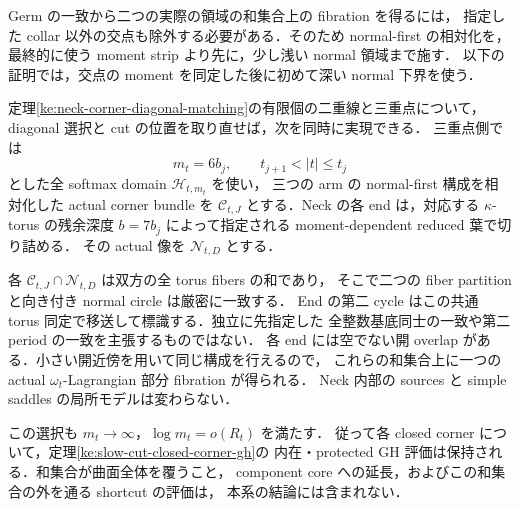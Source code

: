 Germ の一致から二つの実際の領域の和集合上の fibration を得るには，
指定した collar 以外の交点も除外する必要がある．そのため normal-first の相対化を，
最終的に使う moment strip より先に，少し浅い normal 領域まで施す．
以下の証明では，交点の moment を同定した後に初めて深い normal 下界を使う．

\begin{corollary}
\label{ke:neck-corner-saturated-union}
定理\ref{ke:neck-corner-diagonal-matching}の有限個の二重線と三重点について，
diagonal 選択と cut の位置を取り直せば，次を同時に実現できる．
三重点側では
\[
 m_t=6b_j,\qquad t_{j+1}<|t|\le t_j
\]
とした全 softmax domain $\mathcal H_{t,m_t}$ を使い，
三つの arm の normal-first 構成を相対化した actual corner bundle を
$\mathcal C_{t,J}$ とする．Neck の各 end は，対応する $\kappa$-torus の残余深度
$b=7b_j$ によって指定される moment-dependent reduced 葉で切り詰める．
その actual 像を $\mathcal N_{t,D}$ とする．

各 $\mathcal C_{t,J}\cap\mathcal N_{t,D}$ は双方の全 torus fibers の和であり，
そこで二つの fiber partition と向き付き normal circle は厳密に一致する．
End の第二 cycle はこの共通 torus 同定で移送して標識する．独立に先指定した
全整数基底同士の一致や第二 period の一致を主張するものではない．
各 end には空でない開 overlap がある．小さい開近傍を用いて同じ構成を行えるので，
これらの和集合上に一つの actual $\omega_t$-Lagrangian 部分 fibration が得られる．
Neck 内部の sources と simple saddles の局所モデルは変わらない．

この選択も $m_t\to\infty$，$\log m_t=o(R_t)$ を満たす．
従って各 closed corner について，定理\ref{ke:slow-cut-closed-corner-gh}の
内在・protected GH 評価は保持される．和集合が曲面全体を覆うこと，
component core への延長，およびこの和集合の外を通る shortcut の評価は，
本系の結論には含まれない．
\end{corollary}

